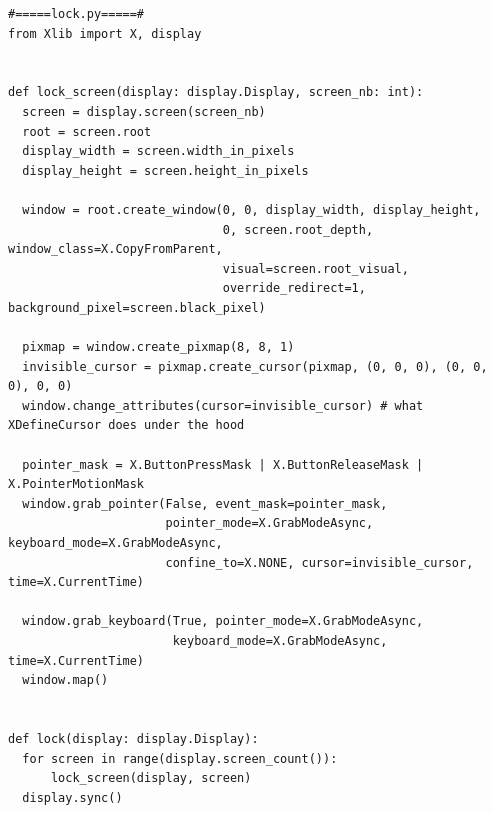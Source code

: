 \documentclass[french]{report}
\begin{document}
\newpage

\begin{verbatim}
#=====lock.py=====#
from Xlib import X, display


def lock_screen(display: display.Display, screen_nb: int):
  screen = display.screen(screen_nb)
  root = screen.root
  display_width = screen.width_in_pixels
  display_height = screen.height_in_pixels

  window = root.create_window(0, 0, display_width, display_height,
                              0, screen.root_depth, window_class=X.CopyFromParent,
                              visual=screen.root_visual,
                              override_redirect=1, background_pixel=screen.black_pixel)

  pixmap = window.create_pixmap(8, 8, 1)
  invisible_cursor = pixmap.create_cursor(pixmap, (0, 0, 0), (0, 0, 0), 0, 0)
  window.change_attributes(cursor=invisible_cursor) # what XDefineCursor does under the hood

  pointer_mask = X.ButtonPressMask | X.ButtonReleaseMask | X.PointerMotionMask
  window.grab_pointer(False, event_mask=pointer_mask,
                      pointer_mode=X.GrabModeAsync, keyboard_mode=X.GrabModeAsync,
                      confine_to=X.NONE, cursor=invisible_cursor, time=X.CurrentTime)

  window.grab_keyboard(True, pointer_mode=X.GrabModeAsync,
                       keyboard_mode=X.GrabModeAsync, time=X.CurrentTime)
  window.map()


def lock(display: display.Display):
  for screen in range(display.screen_count()):
      lock_screen(display, screen)
  display.sync()

\end{verbatim}
\newpage
\end{document}
